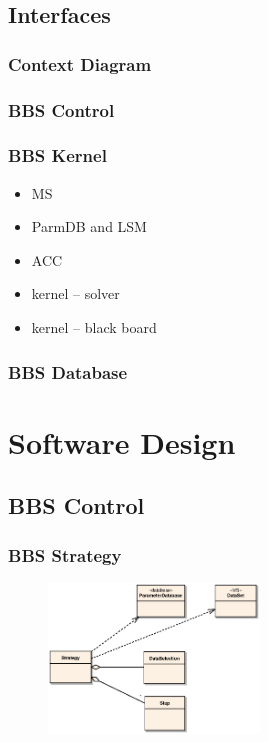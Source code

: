 \documentclass[10pt]{lofar}
\begin{document}
\subsection{Interfaces}
\label{subsec:sys-interfaces}

\subsubsection{Context Diagram}
\label{subsubsec:context}

\subsubsection{BBS Control}
\label{subsubsec:interf-control}

\subsubsection{BBS Kernel}
\label{subsubsec:interf-kernel}

\begin{itemize}
\item MS
\item ParmDB and LSM
\item ACC
\item kernel -- solver
\item kernel -- black board
\end{itemize}

\subsubsection{BBS Database}
\label{subsubsec:interf-database}

\pagebreak

\section{Software Design}
\label{sec:software-design}

\subsection{BBS Control}
\label{subsec:design-control}

\subsubsection{BBS Strategy}
\label{subsubsec:design-strategy}
\begin{figure}[!ht]
\centering
\includegraphics[width=0.5\textwidth]{images/bbs-strategy-class-diagram}
\end{figure}
\end{document}
